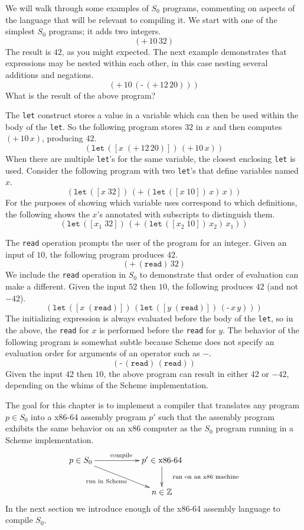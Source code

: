 \documentclass[12pt]{book}
\newcommand{\key}[1]{\texttt{#1}}
\newcommand{\READ}{(\key{read})}
\newcommand{\UNIOP}[2]{(\key{#1}\,#2)}
\newcommand{\BINOP}[3]{(\key{#1}\,#2\,#3)}
\newcommand{\LET}[3]{(\key{let}\,([#1\;#2])\,#3)}
\begin{document}
We will walk through some examples of $S_0$ programs, commenting on
aspects of the language that will be relevant to compiling it.  We
start with one of the simplest $S_0$ programs; it adds two integers.
\[
\BINOP{+}{10}{32}
\]
The result is $42$, as you might expected. 
%
The next example demonstrates that expressions may be nested within
each other, in this case nesting several additions and negations.
\[
\BINOP{+}{10}{ \UNIOP{-}{ \BINOP{+}{12}{20} } }
\]
What is the result of the above program?

The \key{let} construct stores a value in a variable which can then be
used within the body of the \key{let}. So the following program stores
$32$ in $x$ and then computes $\BINOP{+}{10}{x}$, producing $42$.
\[
\LET{x}{ \BINOP{+}{12}{20} }{ \BINOP{+}{10}{x} } 
\]
When there are multiple \key{let}'s for the same variable, the closest
enclosing \key{let} is used. Consider the following program with two
\key{let}'s that define variables named $x$.
\[
\LET{x}{32}{ \BINOP{+}{ \LET{x}{10}{x} }{ x } }
\]
For the purposes of showing which variable uses correspond to which
definitions, the following shows the $x$'s annotated with subscripts
to distinguish them.
\[
\LET{x_1}{32}{ \BINOP{+}{ \LET{x_2}{10}{x_2} }{ x_1 } }
\]

The \key{read} operation prompts the user of the program for an
integer. Given an input of $10$, the following program produces $42$.
\[
\BINOP{+}{(\key{read})}{32}
\]
We include the \key{read} operation in $S_0$ to demonstrate that order
of evaluation can make a different. Given the input $52$ then $10$,
the following produces $42$ (and not $-42$).
\[
\LET{x}{\READ}{ \LET{y}{\READ}{ \BINOP{-}{x}{y} } }
\]
The initializing expression is always evaluated before the body of the
\key{let}, so in the above, the \key{read} for $x$ is performed before
the \key{read} for $y$.
%
The behavior of the following program is somewhat subtle because
Scheme does not specify an evaluation order for arguments of an
operator such as $-$.
\[
\BINOP{-}{\READ}{\READ}
\]
Given the input $42$ then $10$, the above program can result in either
$42$ or $-42$, depending on the whims of the Scheme implementation.

The goal for this chapter is to implement a compiler that translates
any program $p \in S_0$ into a x86-64 assembly program $p'$ such that
the assembly program exhibits the same behavior on an x86 computer as
the $S_0$ program running in a Scheme implementation.
\[
\xymatrix{
p \in S_0  \ar[rr]^{\text{compile}} \ar[drr]_{\text{run in Scheme}\quad}   &&  p' \in \text{x86-64} \ar[d]^{\quad\text{run on an x86 machine}}\\
& & n \in \mathbb{Z}   
}
\]
In the next section we introduce enough of the x86-64 assembly
language to compile $S_0$.
\end{document}
